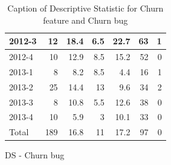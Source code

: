 \documentclass[UKenglish]{ifimaster}  %
\begin{document}
\begin{appendices}
\begin{table}[!htbp]
\begin{adjustwidth}{-1.5cm}{}
\begin{subfigure}[b]{0.3\textwidth}
{\begin{tabular}{ | l | r | r | r | r | r | r | }
 2012-3  & 12 & 18.4 & 6.5 & 22.7 & 63 & 1 \\ \hline
 2012-4  & 10 & 12.9 & 8.5 & 15.2 & 52 & 0\\ \hline
 2013-1  & 8 & 8.2 & 8.5 & 4.4 & 16 & 1 \\ \hline
 2013-2  & 25 & 14.4 & 13 & 9.6 & 34 & 2 \\ \hline
 2013-3  & 8 & 10.8 & 5.5 & 12.6 & 38 & 0\\ \hline
 2013-4  & 10 & 5.9 & 3 & 10.1 & 33 & 0\\ \hline
 Total  & 189 & 16.8 & 11 & 17.2 & 97 & 0\\ \hline\end{tabular}
}
\caption{DS - Churn bug}
\label{DS:CB:1}
\end{subfigure}
\end{adjustwidth}
\caption[Optional caption for list of figures]{Caption of Descriptive Statistic for Churn feature and Churn bug}
\label{DS:1:4} %
\end{table}






\end{appendices}
\end{document}
